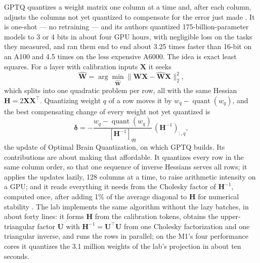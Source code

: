 GPTQ quantizes a weight matrix one column at a time and, after each column,
adjusts the columns not yet quantized to compensate for the error just made
\cite{frantar2023gptq}. It is one-shot --- no retraining --- and its authors
quantized 175-billion-parameter models to 3 or 4 bits in about four GPU hours,
with negligible loss on the tasks they measured, and ran them end to end about
3.25 times faster than 16-bit on an A100 and 4.5 times on the less expensive
A6000. The idea is exact least
squares. For a layer with calibration inputs $\mathbf{X}$ it seeks
\begin{equation}
\hat{\mathbf{W}} = \arg\min_{\hat{\mathbf{W}}}
\lVert \mathbf{W}\mathbf{X} - \hat{\mathbf{W}}\mathbf{X} \rVert_2^2 ,
\label{eq:gptq-objective}
\end{equation}
which splits into one quadratic problem per row, all with the same Hessian
$\mathbf{H} = 2\mathbf{X}\mathbf{X}^{\top}$. Quantizing weight $q$ of a row moves
it by $w_q - \operatorname{quant}(w_q)$, and the best compensating change of
every weight not yet quantized is
\begin{equation}
\boldsymbol{\delta} = -\frac{w_q - \operatorname{quant}(w_q)}{[\mathbf{H}^{-1}]_{qq}}\,
(\mathbf{H}^{-1})_{:,q},
\label{eq:obq-update}
\end{equation}
the update of Optimal Brain Quantization, on which GPTQ builds. Its
contributions are about making that affordable. It quantizes every row in the
same column order, so that one sequence of inverse Hessians serves all rows;
it applies the updates lazily, 128 columns at a time, to raise arithmetic
intensity on a GPU; and it reads everything it needs from the Cholesky factor
of $\mathbf{H}^{-1}$, computed once, after adding 1\% of the average diagonal to
$\mathbf{H}$ for numerical stability \cite{frantar2023gptq}. The lab implements
the same algorithm without the lazy batches, in about forty lines: it forms
$\mathbf{H}$ from the calibration tokens, obtains the upper-triangular factor
$\mathbf{U}$ with $\mathbf{H}^{-1} = \mathbf{U}^{\top}\mathbf{U}$ from one Cholesky
factorization and one triangular inverse, and runs the rows in parallel; on
the M1's four performance cores it quantizes the 3.1 million weights of the lab's
projection in about ten seconds.

